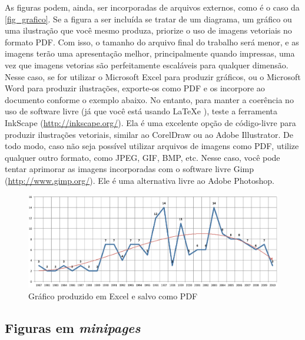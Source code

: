 As figuras podem, ainda, ser incorporadas de arquivos externos, como é o caso da
\autoref{fig_grafico}. Se a figura a ser incluída se tratar de um diagrama, um
gráfico ou uma ilustração que você mesmo produza, priorize o uso de imagens
vetoriais no formato PDF. Com isso, o tamanho do arquivo final do trabalho será
menor, e as imagens terão uma apresentação melhor, principalmente quando
impressas, uma vez que imagens vetorias são perfeitamente escaláveis para
qualquer dimensão. Nesse caso, se for utilizar o Microsoft Excel para produzir
gráficos, ou o Microsoft Word para produzir ilustrações, exporte-os como PDF e
os incorpore ao documento conforme o exemplo abaixo. No entanto, para manter a
coerência no uso de software livre (já que você está usando \LaTeX e \abnTeX),
teste a ferramenta \textsf{InkScape}
(\url{http://inkscape.org/}). Ela é uma excelente opção de código-livre para
produzir ilustrações vetoriais, similar ao CorelDraw ou ao Adobe
Illustrator. De todo modo, caso não seja possível
utilizar arquivos de imagens como PDF, utilize qualquer outro formato, como
JPEG, GIF, BMP, etc. Nesse caso, você pode tentar aprimorar as imagens
incorporadas com o software livre \textsf{Gimp}
(\url{http://www.gimp.org/}). Ele é uma alternativa livre ao Adobe
Photoshop.
\begin{figure}[htb]
	\caption{\label{fig_grafico}Gráfico produzido em Excel e salvo como PDF}
	\begin{center}
	    \includegraphics[scale=0.5]{abntex2-modelo-img-grafico.pdf}
	\end{center}
\end{figure}

\subsection{Figuras em \emph{minipages}}

